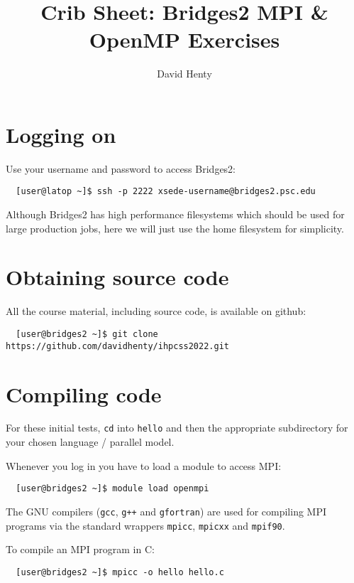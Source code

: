 \documentclass{article}
\begin{document}
\title{Crib Sheet: Bridges2 MPI \& OpenMP Exercises}

\author{David Henty}
\date{}
\makeEPCCtitle


\section{{\label{sec:access}}Logging on}

Use your username and password to access Bridges2:
\begin{verbatim}
  [user@latop ~]$ ssh -p 2222 xsede-username@bridges2.psc.edu
\end{verbatim}

Although Bridges2 has high performance filesystems which should be
used for large production jobs, here we will just use the home
filesystem for simplicity.

\section{Obtaining source code}

All the course material, including source code, is available on github:

\begin{verbatim}
  [user@bridges2 ~]$ git clone https://github.com/davidhenty/ihpcss2022.git
\end{verbatim}

\section{Compiling code}

For these initial tests, \texttt{cd} into \texttt{hello} and then the
appropriate subdirectory for your chosen language / parallel model.

Whenever you log in you have to load a module to access MPI:

\begin{verbatim}
  [user@bridges2 ~]$ module load openmpi
\end{verbatim}

The GNU compilers (\texttt{gcc}, \texttt{g++} and \texttt{gfortran}) are
used for compiling MPI programs via the standard wrappers
\texttt{mpicc}, \texttt{mpicxx} and \texttt{mpif90}.

To compile an MPI program in C:

\begin{verbatim}
  [user@bridges2 ~]$ mpicc -o hello hello.c
\end{verbatim}
\end{document}
